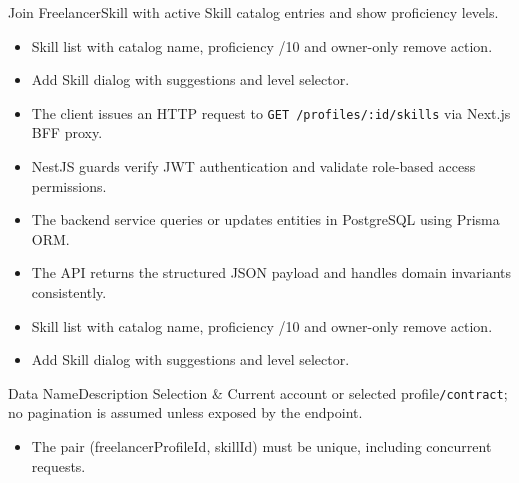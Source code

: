 \noindent Join FreelancerSkill with active Skill catalog entries and show proficiency levels.

\begin{itemize}[leftmargin=1.6em,topsep=3pt,itemsep=2pt,parsep=0pt,label=$\bullet$]
    \item Skill list with catalog name, proficiency /10 and owner-only remove action.
    \item Add Skill dialog with suggestions and level selector.
\end{itemize}

\begin{itemize}[leftmargin=1.6em,topsep=3pt,itemsep=2pt,parsep=0pt,label=$\bullet$]
    \item The client issues an HTTP request to \texttt{GET /\allowbreak{}profiles/\allowbreak{}:\allowbreak{}id/\allowbreak{}skills} via Next.js BFF proxy.
    \item NestJS guards verify JWT authentication and validate role-based access permissions.
    \item The backend service queries or updates entities in PostgreSQL using Prisma ORM.
    \item The API returns the structured JSON payload and handles domain invariants consistently.
\end{itemize}

\begin{itemize}[leftmargin=1.6em,topsep=3pt,itemsep=2pt,parsep=0pt,label=$\bullet$]
    \item Skill list with catalog name, proficiency /10 and owner-only remove action.
    \item Add Skill dialog with suggestions and level selector.
\end{itemize}


\begin{specdatatable}{Data Name}{Description}
Selection & Current account or selected profile\texttt{/\allowbreak{}contract}; no pagination is assumed unless exposed by the endpoint.\\ \hline
\end{specdatatable}

\begin{itemize}[leftmargin=1.6em,topsep=3pt,itemsep=2pt,parsep=0pt,label=$\bullet$]
    \item The pair (freelancerProfileId, skillId) must be unique, including concurrent requests.
\end{itemize}

